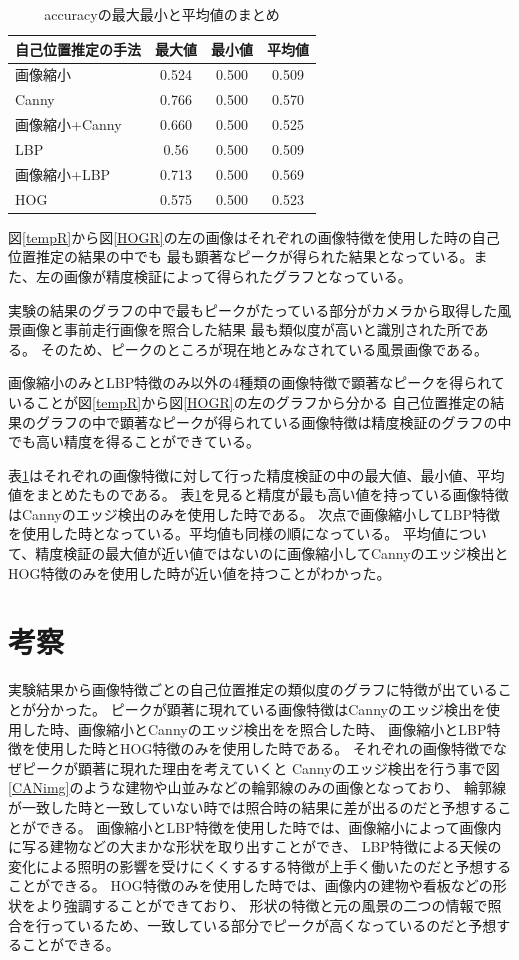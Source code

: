 \documentclass[titlepage,dvipdfmx]{jsarticle}
\begin{document}
\begin{table}[t]
  \centering
  \caption{accuracyの最大最小と平均値のまとめ}
  \label{t1}
  \begin{tabular}{lccc}
    自己位置推定の手法&最大値&最小値&平均値\\\hline
    画像縮小&0.524&0.500&0.509\\
    Canny&0.766&0.500&0.570\\
    画像縮小+Canny&0.660&0.500&0.525\\
    LBP&0.56&0.500&0.509\\
    画像縮小+LBP&0.713&0.500&0.569\\
    HOG&0.575&0.500&0.523\\
  \end{tabular}
\end{table}
図\ref{tempR}から図\ref{HOGR}の左の画像はそれぞれの画像特徴を使用した時の自己位置推定の結果の中でも
最も顕著なピークが得られた結果となっている。また、左の画像が精度検証によって得られたグラフとなっている。

実験の結果のグラフの中で最もピークがたっている部分がカメラから取得した風景画像と事前走行画像を照合した結果
最も類似度が高いと識別された所である。
そのため、ピークのところが現在地とみなされている風景画像である。

画像縮小のみとLBP特徴のみ以外の4種類の画像特徴で顕著なピークを得られていることが図\ref{tempR}から図\ref{HOGR}の左のグラフから分かる
自己位置推定の結果のグラフの中で顕著なピークが得られている画像特徴は精度検証のグラフの中でも高い精度を得ることができている。

表\ref{t1}はそれぞれの画像特徴に対して行った精度検証の中の最大値、最小値、平均値をまとめたものである。
表\ref{t1}を見ると精度が最も高い値を持っている画像特徴はCannyのエッジ検出のみを使用した時である。
次点で画像縮小してLBP特徴を使用した時となっている。平均値も同様の順になっている。
平均値について、精度検証の最大値が近い値ではないのに画像縮小してCannyのエッジ検出とHOG特徴のみを使用した時が近い値を持つことがわかった。

\section{考察}
実験結果から画像特徴ごとの自己位置推定の類似度のグラフに特徴が出ていることが分かった。
ピークが顕著に現れている画像特徴はCannyのエッジ検出を使用した時、画像縮小とCannyのエッジ検出をを照合した時、
画像縮小とLBP特徴を使用した時とHOG特徴のみを使用した時である。
それぞれの画像特徴でなぜピークが顕著に現れた理由を考えていくと
Cannyのエッジ検出を行う事で図\ref{CANimg}のような建物や山並みなどの輪郭線のみの画像となっており、
輪郭線が一致した時と一致していない時では照合時の結果に差が出るのだと予想することができる。
画像縮小とLBP特徴を使用した時では、画像縮小によって画像内に写る建物などの大まかな形状を取り出すことができ、
LBP特徴による天候の変化による照明の影響を受けにくくするする特徴が上手く働いたのだと予想することができる。
HOG特徴のみを使用した時では、画像内の建物や看板などの形状をより強調することができており、
形状の特徴と元の風景の二つの情報で照合を行っているため、一致している部分でピークが高くなっているのだと予想することができる。
\end{document}
